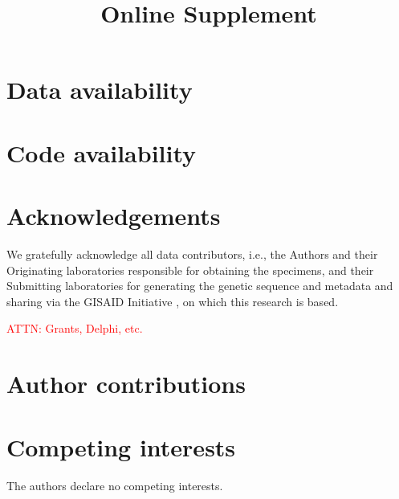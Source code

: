 \documentclass{article}
\newcommand{\beginsupplement}{
  \setcounter{table}{0}  
  \renewcommand{\thetable}{S\arabic{table}} 
  \setcounter{figure}{0} 
  \renewcommand{\thefigure}{S\arabic{figure}}
  \setcounter{section}{0} 
  \renewcommand{\thesection}{S\arabic{section}}
}
\newcommand{\attn }[1]{\textcolor{red}{ATTN: #1}}
\begin{document}









\section*{Data availability}
\section*{Code availability}

\clearpage
%




\section*{Acknowledgements}

We gratefully acknowledge all data contributors, i.e., the Authors and their
Originating laboratories responsible for obtaining the specimens, and their
Submitting laboratories for generating the genetic sequence and metadata and
sharing via the GISAID Initiative \citep{elbe2017data}, on which this research
is based.

\attn{Grants, Delphi, etc.}

\section*{Author contributions}

\section*{Competing interests}

The authors declare no competing interests.





\clearpage
\beginsupplement
\title{\supptitlefont Online Supplement}
\maketitle


\end{document}
